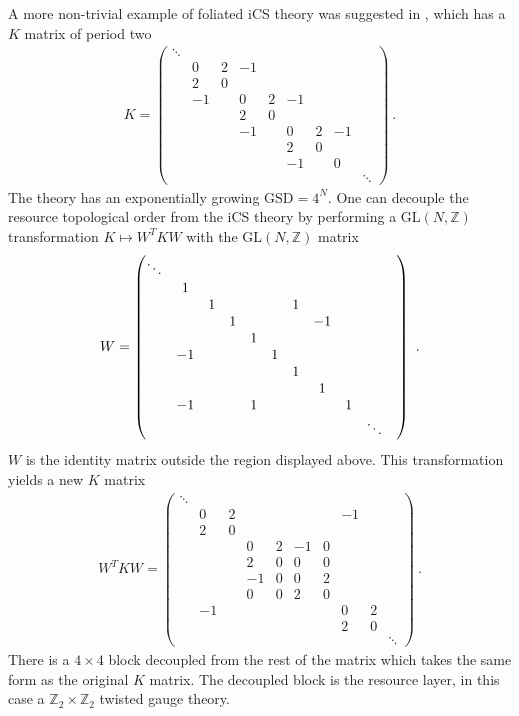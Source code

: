\documentclass[aps,prb,twocolumn,superscriptaddress,floatfix,10pt,nofootinbib]{revtex4-2}
\newcommand{\ie}{\begin{equation}\begin{aligned}}
\newcommand{\fe}{\end{aligned}\end{equation}}
\theoremstyle{definition}
\begin{document}
A more non-trivial example of foliated iCS theory was suggested in \cite{Shirley_2020}, which has a $K$ matrix of period two
\ie\label{eq:period2matrix}
K=
\begin{pmatrix}
    \ddots&&&\\
&0&2&-1&\\
&2&0&&\\
&-1 &&0&2&-1\\
&&&2&0&\\
&&&-1&&0&2 & -1\\
&&&&&2&0
\\
&&&&&-1 && 0\\
&&&&&&&&\ddots
\end{pmatrix}~.
\fe
The theory has an exponentially growing  $\text{GSD}=4^N$.
One can decouple the resource topological order from the iCS theory by performing a $\text{GL}(N,\mathbb{Z})$ transformation $K\mapsto W^T KW$ with the $\text{GL}(N,\mathbb{Z})$ matrix
\ie
W=
\setcounter{MaxMatrixCols}{12}
\begin{pmatrix}
    \ddots &  &  &  &  &  &  &  &  & &  \\
& 1 &  &  &  &  &  &  &  & &  \\
&  & 1 &  &  &  & 1 &  &  & &  \\
&  &  & 1 &  &  &  & -1 &  & &  \\
&  &  &  & 1 &  &  &  &  & &  \\
& -1 &  &  &  & 1 &  &  &  & &  \\
&  &  &  &  &  & 1 &  &  & &  \\
&  &  &  &  &  &  & 1 &  & &  \\
& -1 &  &  & 1 &  &  &  & 1 & &  \\
&  &  &  &  &  &  &  &  & \ddots 
\end{pmatrix}~.
\fe
$W$ is the identity matrix outside the region displayed above. This transformation yields a new $K$ matrix
\ie
W^TKW=
\begin{pmatrix}
    \ddots &  &  &  &  &  &  &  &  &  \\
& 0 & 2 &  &  &  &  & -1 &  &  \\
& 2 & 0 &  &  &  &  &  &  &  \\
&  &  & 0 & 2 & -1 & 0 &  &  &  \\
&  &  & 2 & 0 & 0 & 0 &  &  &  \\
&  &  & -1 & 0 & 0 & 2 &  &  &  \\
&  &  & 0 & 0 & 2 & 0 &  &  &  \\
& -1 &  &  &  &  &  & 0 & 2 &  \\
&  &  &  &  &  &  & 2 & 0 &  \\
&  &  &  &  &  &  &  &  & \ddots
\end{pmatrix}~.
\fe
There is a $4\times 4$ block decoupled from the rest of the matrix which takes the same form as the original $K$ matrix. The decoupled block is the resource layer, in this case a $\mathbb{Z}_2\times \mathbb{Z}_2$ twisted gauge theory. 
\end{document}
